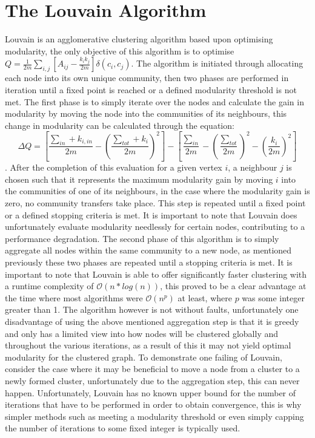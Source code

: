 \section{The Louvain Algorithm}
Louvain \cite{blondel2008fast} is an agglomerative clustering algorithm based upon optimising modularity, the only objective of this algorithm is to optimise $Q=\frac{1}{2 m} \sum_{i, j}\left[A_{i j}-\frac{k_{i} k_{j}}{2 m}\right] \delta\left(c_{i}, c_{j}\right)$. The algorithm is initiated through allocating each node into its own unique community, then two phases are performed in iteration until a fixed point is reached or a defined modularity threshold is not met. The first phase is to simply iterate over the nodes and calculate the gain in modularity by moving the node into the communities of its neighbours, this change in modularity can be calculated through the equation: $$\Delta Q=\left[\frac{\sum_{i n}+k_{i, i n}}{2 m}-\left(\frac{\sum_{t o t}+k_{i}}{2 m}\right)^{2}\right]-\left[\frac{\sum_{i n}}{2 m}-\left(\frac{\sum_{t o t}}{2 m}\right)^{2}-\left(\frac{k_{i}}{2 m}\right)^{2}\right]$$. After the completion of this evaluation for a given vertex $i$, a neighbour $j$ is chosen such that it represents the maximum modularity gain by moving $i$ into the communities of one of its neighbours, in the case where the modularity gain is zero, no community transfers take place. This step is repeated until a fixed point or a defined stopping criteria is met. It is important to note that Louvain does unfortunately evaluate modularity needlessly for certain nodes, contributing to a performance degradation. The second phase of this algorithm is to simply aggregate all nodes within the same community to a new node, as mentioned previously these two phases are repeated until a stopping criteria is met. It is important to note that Louvain \cite{blondel2008fast} is able to offer significantly faster clustering with a runtime complexity of $\mathcal{O}(n*log(n))$, this proved to be a clear advantage at the time where most algorithms were $\mathcal{O}(n^p)$ at least, where $p$ was some integer greater than 1. The algorithm however is not without faults, unfortunately one disadvantage of using the above mentioned aggregation step is that it is greedy and only has a limited view into how nodes will be clustered globally and throughout the various iterations, as a result of this it may not yield optimal modularity for the clustered graph. To demonstrate one failing of Louvain, consider the case where it may be beneficial to move a node from a cluster to a newly formed cluster, unfortunately due to the aggregation step, this can never happen. Unfortunately, Louvain has no known upper bound for the number of iterations that have to be performed in order to obtain convergence, this is why simpler methods such as meeting a modularity threshold or even simply capping the number of iterations to some fixed integer is typically used. 

